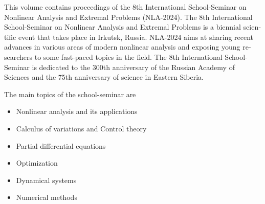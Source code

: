 \documentclass[12pt,final]{llncs}
\begin{document}
 \begin{english}

This volume contains proceedings of the 8th International School-Seminar on Nonlinear Analysis and Extremal Problems (NLA-2024).
The 8th International School-Seminar on Nonlinear Analysis and Extremal Problems is a biennial scientific event that takes place in Irkutsk, Russia. NLA-2024 aims at sharing recent advances in various areas of modern nonlinear analysis and exposing young researchers to some fast-paced topics in the field. The 8th International School-Seminar is dedicated to the 300th anniversary of the Russian Academy of Sciences and the 75th anniversary of science in Eastern Siberia.


The main topics of the  school-seminar are
\begin{itemize}
\item Nonlinear analysis and its applications
\item Calculus of variations and Control theory
\item Partial differential equations
\item Optimization
\item Dynamical systems
\item  Numerical methods


\end{itemize}
\end{english}
\end{document}
